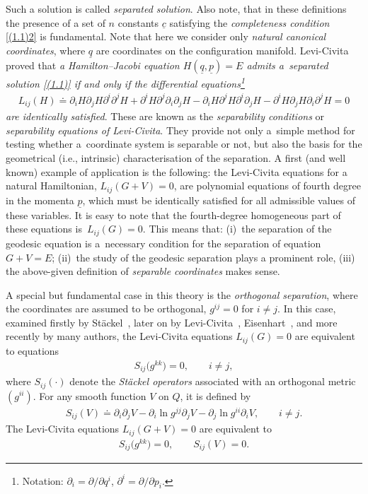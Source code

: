 \documentclass[10pt,a4paper]{amsart}
\numberwithin{equation}{section}
\begin{document}
Such a solution is called {\it separated solution}. Also note, that in these def\/initions the presence of a set of $n$ constants $\underline c$ satisfying the {\it completeness condition} \eqref{(1.1)2} is fundamental. Note that here we consider only {\it natural canonical coordinates}, where $\underline q$ are coordinates on the conf\/iguration manifold. Levi-Civita~\cite{LC-1904} proved that {\it a Hamilton--Jacobi equation $H(\underline q,\underline p)=E$ admits a~separated solution \eqref{(1.1)} if and only if the differential equations\footnote{Notation: $\partial_i=\partial/\partial q^i$, $\partial^i=\partial/\partial p_i$.}
\begin{gather*}
L_{ij}(H)\doteq \partial _i H\partial_jH \partial ^i\partial^jH+
\partial^iH \partial ^j \partial _i\partial_jH-
\partial_iH \partial ^jH \partial ^i\partial _jH-
\partial^iH \partial _jH \partial _i\partial ^jH=0
\end{gather*}
are identically satisfied}. These are known as the {\it separability conditions} or {\it separability equations of Levi-Civita}. They provide not only a~simple method for testing whether a~coordinate system is separable or not, but also the basis for the geometrical (i.e., intrinsic) characterisation of the separation. A f\/irst (and well known) example of application is the following: the Levi-Civita equations for a natural Hamiltonian, $L_{ij}(G+V)=0$, are polynomial equations of fourth degree in the momenta $\underline p$, which must be identically satisf\/ied for all admissible values of these variables. It is easy to note that the fourth-degree homogeneous part of these equations is~$L_{ij}(G)=0$. This means that: (i)~the separation of the geodesic equation is a~necessary condition for the separation of equation $G+V=E$; (ii)~the study of the geodesic separation plays a prominent role, (iii) the above-given def\/inition of {\it separable coordinates} makes sense.

A special but fundamental case in this theory is the {\it orthogonal separation}, where the coordinates are assumed to be orthogonal, $g^{ij}=0$ for $i\neq j$. In this case, examined f\/irstly by St\"ackel~\cite{Stackel-1893,Stackel-1897}, later on by Levi-Civita~\cite{LC-1904}, Eisenhart~\cite{Eisenhart-1934,Eisenhart-1949}, and more recently by many authors, the Levi-Civita equations $L_{ij}(G)=0$ are equivalent to equations
\begin{gather}\label{(1.2)}
S_{ij}\big(g^{kk}\big)=0, \qquad i\neq j,
\end{gather}
where $S_{ij}(\cdot)$ denote the {\it St\"ackel operators} associated with an orthogonal metric $(g^{ii})$.
For any smooth function $V$ on $Q$, it is def\/ined by
\begin{gather*}
S_{ij}(V)\doteq \partial_i\partial_j V-\partial_i\ln g^{jj}\partial_j V-\partial_j\ln g^{ii}\partial_i V,  \qquad i\neq j.
\end{gather*}
The Levi-Civita equations $L_{ij}(G+V)=0$ are equivalent to
\begin{gather}
S_{ij}\big(g^{kk}\big)=0, \qquad S_{ij}(V)=0.
\label{(1.3)}
\end{gather}
\end{document}
